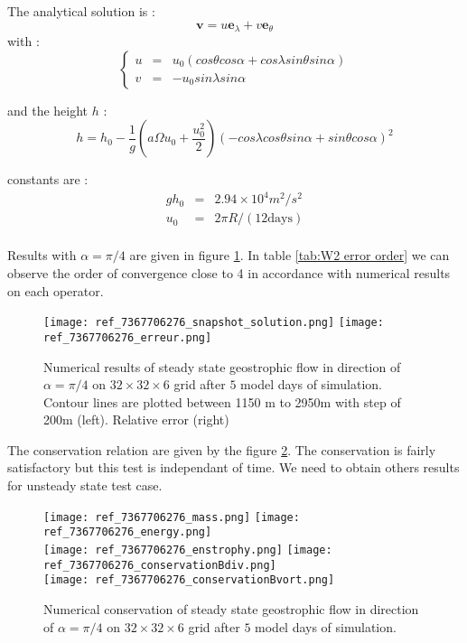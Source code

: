The analytical solution is :
\begin{equation}
\mathbf{v} = u \mathbf{e}_{\lambda} + v \mathbf{e}_{\theta}
\end{equation}
with :
\begin{equation}
\left\lbrace
\begin{array}{rcl}
u & = & u_0 \left( cos \theta cos \alpha + cos \lambda sin \theta sin \alpha \right)\\
v & = & -u_0 sin \lambda sin \alpha
\end{array}
\label{eq:W2 velocity}
\right.
\end{equation}

and the height $h$ :
\begin{equation}
h=h_0- \dfrac{1}{g} \left( a \Omega u_0 + \dfrac{u_0^2}{2} \right) \left( -cos \lambda cos \theta sin \alpha + sin \theta cos \alpha \right)^2 
\label{eq:W2 height}
\end{equation}

constants are :
\begin{equation}
\begin{array}{rcl}
gh_0 & = & 2.94 \times 10^4 m^2/s^2\\
u_0 & = & 2 \pi R / (12 \text{days}) \\
\end{array}
\end{equation}

Results with $\alpha=\pi/4$ are given in figure \ref{fig:W2 alpha=pi/4}. In table \ref{tab:W2 error order} we can observe the order of convergence close to 4 in accordance with numerical results on each operator.

\begin{figure}[ht!]
\texttt{[image: ref\_7367706276\_snapshot\_solution.png]}
\texttt{[image: ref\_7367706276\_erreur.png]}
\caption{Numerical results of steady state geostrophic flow in direction of $\alpha=\pi/4$ on  $32 \times 32 \times 6$ grid after $5$ model days of simulation. Contour lines are plotted between 1150 m to 2950m with step of 200m (left). Relative error (right) }
\label{fig:W2 alpha=pi/4}
\end{figure}

The conservation relation are given by the figure \ref{fig:W2 conservation alpha=pi/4}. The conservation is fairly satisfactory but this test is independant of time. We need to obtain others results for unsteady state test case. 

\begin{figure}[ht!]
\texttt{[image: ref\_7367706276\_mass.png]}
\texttt{[image: ref\_7367706276\_energy.png]}\\
\texttt{[image: ref\_7367706276\_enstrophy.png]}
\texttt{[image: ref\_7367706276\_conservationBdiv.png]}\\
\texttt{[image: ref\_7367706276\_conservationBvort.png]}
\caption{Numerical conservation of steady state geostrophic flow in direction of $\alpha=\pi/4$ on  $32 \times 32 \times 6$ grid after $5$ model days of simulation.}
\label{fig:W2 conservation alpha=pi/4}
\end{figure}

